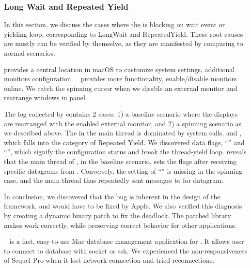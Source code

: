 \subsubsection{Long Wait and Repeated Yield}

In this section, we discuss the cases where the \spinningnode is blocking on
wait event or yielding loop, corresponding to LongWait and RepeatedYield.
These root causes are mostly can be verified by themselve, as they are
manifested by comparing to normal scenarios.


 provides a central location in macOS to
customize system settings, \eg additional monitors configuration.
~\cite{disablemonitor} provides more functionality,
enable/disable monitors online. We catch the spinning cursor when we disable
an external monitor and rearrange windows in  panel.

The log collected by \xxx contains 2 cases: 1) a baseline scenario where
the displays are rearranged with the enabled external monitor, and 2) a
spinning scenario as we described above. The \spinningnode in the main
thread is dominated by system calls,  and ,
which falls into the category of Repeated Yield. We discovered data flags,
``'' and ``'', which
signify the configuration status and break the thread-yield loop. \xxx reveals
that the main thread of , in the baseline scenario, sets
the flags after receiving specific datagrams from . Conversely,
the setting of ``'' is missing in the spinning case,
and the main thread thus repeatedly sent messages to  for
datagram.

In conclusion, we discovered that the bug is inherent in the design of the
 framework, and would have to be fixed by Apple. We also
verified this diagnosis by creating a dynamic binary patch to fix the deadlock.
The patched library makes  work correctly, while preserving
correct behavior for other applications.


~\cite{SequelPro} is a fast, easy-to-use Mac database management
application for . It allows user to connect to database with socket or ssh.
We experienced the non-responsiveness of Sequel Pro when it lost network
connection and tried reconnections.

